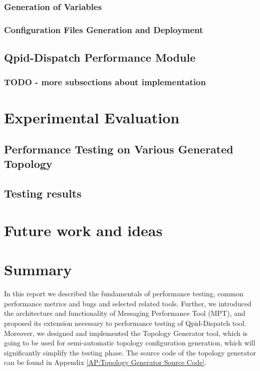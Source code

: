 \subsection{Generation of Variables}

\subsection{Configuration Files Generation and Deployment}

\section{Qpid-Dispatch Performance Module}

\subsection{TODO - more subsections about implementation}

\chapter{Experimental Evaluation}
\label{Experimental Evaluation}

\section{Performance Testing on Various Generated Topology}

\section{Testing results}

\chapter{Future work and ideas}
\label{Future work and ideas}

\chapter{Summary}
\label{Summary}
In this report we described the fundamentals of performance testing, common performance metrics and bugs and selected related tools. Further, we introduced the architecture and functionality of Messaging Performance Tool (MPT), and proposed its extension necessary to performance testing of Qpid-Dispatch tool. Moreover, we designed and implemented the Topology Generator tool, which is going to be used for semi-automatic topology configuration generation, which will significantly simplify the testing phase. The source code of the topology generator can be found in Appendix \ref{AP:Topology Generator Source Code}.

